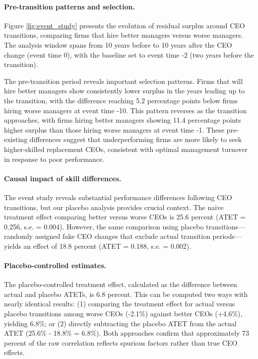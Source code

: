 \documentclass[11pt,a4paper]{article}
\begin{document}
\paragraph{Pre-transition patterns and selection.} Figure \ref{fig:event_study} presents the evolution of residual surplus around CEO transitions, comparing firms that hire better managers versus worse managers. The analysis window spans from 10 years before to 10 years after the CEO change (event time 0), with the baseline set to event time -2 (two years before the transition).

The pre-transition period reveals important selection patterns. Firms that will hire better managers show consistently lower surplus in the years leading up to the transition, with the difference reaching 5.2 percentage points below firms hiring worse managers at event time -10. This pattern reverses as the transition approaches, with firms hiring better managers showing 11.4 percentage points higher surplus than those hiring worse managers at event time -1. These pre-existing differences suggest that underperforming firms are more likely to seek higher-skilled replacement CEOs, consistent with optimal management turnover in response to poor performance.

\paragraph{Causal impact of skill differences.} The event study reveals substantial performance differences following CEO transitions, but our placebo analysis provides crucial context. The naive treatment effect comparing better versus worse CEOs is 25.6 percent (ATET = 0.256, s.e. = 0.004). However, the same comparison using placebo transitions---randomly assigned fake CEO changes that exclude actual transition periods---yields an effect of 18.8 percent (ATET = 0.188, s.e. = 0.002).

\paragraph{Placebo-controlled estimates.} The placebo-controlled treatment effect, calculated as the difference between actual and placebo ATETs, is 6.8 percent. This can be computed two ways with nearly identical results: (1) comparing the treatment effect for actual versus placebo transitions among worse CEOs (-2.1\%) against better CEOs (+4.6\%), yielding 6.8\%; or (2) directly subtracting the placebo ATET from the actual ATET (25.6\% - 18.8\% = 6.8\%). Both approaches confirm that approximately 73 percent of the raw correlation reflects spurious factors rather than true CEO effects.
\end{document}
